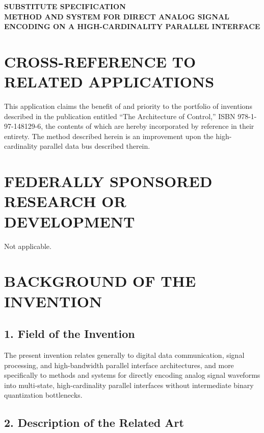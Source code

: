 \documentclass[11pt,letterpaper]{article}
\begin{document}
\thispagestyle{empty}

\begin{center}
    \textbf{\large SUBSTITUTE SPECIFICATION} \\
    \vspace{0.4cm}
    \textbf{\large METHOD AND SYSTEM FOR DIRECT ANALOG SIGNAL ENCODING ON A HIGH-CARDINALITY PARALLEL INTERFACE}
\end{center}

\vspace{0.5cm}

\section*{CROSS-REFERENCE TO RELATED APPLICATIONS}

This application claims the benefit of and priority to the portfolio of inventions described in the publication entitled ``The Architecture of Control,'' ISBN 978-1-97-148129-6, the contents of which are hereby incorporated by reference in their entirety. The method described herein is an improvement upon the high-cardinality parallel data bus described therein.

\section*{FEDERALLY SPONSORED RESEARCH OR DEVELOPMENT}

Not applicable.

\section*{BACKGROUND OF THE INVENTION}

\subsection*{1. Field of the Invention}

The present invention relates generally to digital data communication, signal processing, and high-bandwidth parallel interface architectures, and more specifically to methods and systems for directly encoding analog signal waveforms into multi-state, high-cardinality parallel interfaces without intermediate binary quantization bottlenecks.

\subsection*{2. Description of the Related Art}
\end{document}
